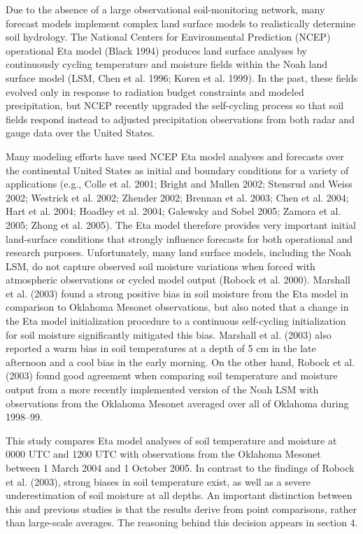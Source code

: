 \documentclass[twocolumn]{article}
\begin{document}
Due to the absence of a large observational soil-monitoring network, many forecast models implement complex land surface models to realistically determine soil hydrology.  The National Centers for Environmental Prediction (NCEP) operational Eta model (Black 1994) produces land surface analyses by continuously cycling temperature and moisture fields within the Noah land surface model (LSM, Chen et al. 1996; Koren et al. 1999).  In the past, these fields evolved only in response to radiation budget constraints and modeled precipitation, but NCEP recently upgraded the self-cycling process so that soil fields respond instead to adjusted precipitation observations from both radar and gauge data over the United States.

Many modeling efforts have used NCEP Eta model analyses and forecasts over the continental United States as initial and boundary conditions for a variety of applications (e.g., Colle et al. 2001; Bright and Mullen 2002; Stensrud and Weiss 2002; Westrick et al. 2002; Zhender 2002; Brennan et al. 2003; Chen et al. 2004; Hart et al. 2004; Hoadley et al. 2004; Galewsky and Sobel 2005; Zamora et al. 2005; Zhong et al. 2005).  The Eta model therefore provides very important initial land-surface conditions that strongly influence forecasts for both operational and research purposes.  Unfortunately, many land surface models, including the Noah LSM, do not capture observed soil moisture variations when forced with atmospheric observations or cycled model output (Robock et al. 2000).  Marshall et al. (2003) found a strong positive bias in soil moisture from the Eta model in comparison to Oklahoma Mesonet observations, but also noted that a change in the Eta model initialization procedure to a continuous self-cycling initialization for soil moisture significantly mitigated this bias.  Marshall et al. (2003) also reported a warm bias in soil temperatures at a depth of 5 cm in the late afternoon and a cool bias in the early morning.  On the other hand, Robock et al. (2003) found good agreement when comparing soil temperature and moisture output from a more recently implemented version of the Noah LSM with observations from the Oklahoma Mesonet averaged over all of Oklahoma during 1998--99.

This study compares Eta model analyses of soil temperature and moisture at 0000 UTC and 1200 UTC with observations from the Oklahoma Mesonet between 1 March 2004 and 1 October 2005.  In contrast to the findings of Robock et al. (2003), strong biases in soil temperature exist, as well as a severe underestimation of soil moisture at all depths.  An important distinction between this and previous studies is that the results derive from point comparisons, rather than large-scale averages.  The reasoning behind this decision appears in section 4.
\end{document}
